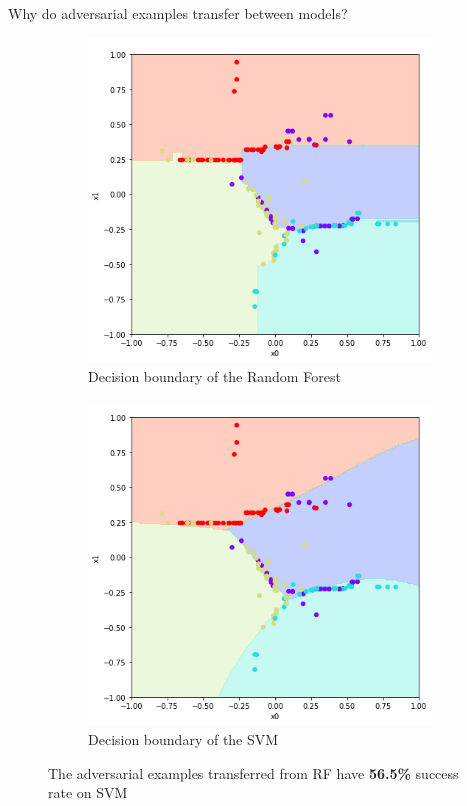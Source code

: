 \documentclass[9pt]{beamer}
\begin{document}
\begin{frame}{Why do adversarial examples transfer between models?}
\begin{figure}
    \centering
    \small
    \begin{subfigure}[t]{0.4\linewidth}
        \centering
        \includegraphics[width=\linewidth]{images/rf.png}
        \caption{Decision boundary of the Random Forest}
    \end{subfigure}
    \hspace{2em}
    \begin{subfigure}[t]{0.4\linewidth}
        \centering
        \includegraphics[width=\linewidth]{images/svm.png}
        \caption{Decision boundary of the SVM}
    \end{subfigure}
    \caption{The adversarial examples transferred from RF have \textbf{56.5\%} success rate on SVM}
\end{figure}
\end{frame}
\end{document}
